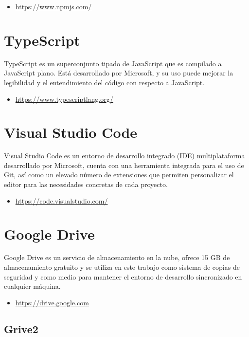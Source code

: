 \begin{itemize}
	\item \url{https://www.npmjs.com/}
\end{itemize}

\section{TypeScript}

TypeScript es un superconjunto tipado de JavaScript que es compilado a JavaScript plano. Está desarrollado por Microsoft, y su uso puede mejorar la legibilidad y el entendimiento del código con respecto a JavaScript.

\begin{itemize}
	\item \url{https://www.typescriptlang.org/}
\end{itemize}

\section{Visual Studio Code}

Visual Studio Code es un entorno de desarrollo integrado (IDE) multiplataforma desarrollado por Microsoft, cuenta con una herramienta integrada para el uso de Git, así como un elevado número de extensiones que permiten personalizar el editor para las necesidades concretas de cada proyecto.

\begin{itemize}
	\item \url{https://code.visualstudio.com/}
\end{itemize}

\section{Google Drive}

Google Drive es un servicio de almacenamiento en la nube, ofrece 15 GB de almacenamiento gratuito y se utiliza en este trabajo como sistema de copias de seguridad y como medio para mantener el entorno de desarrollo sincronizado en cualquier máquina.

\begin{itemize}
	\item \url{https://drive.google.com}
\end{itemize}

\subsection{Grive2}

